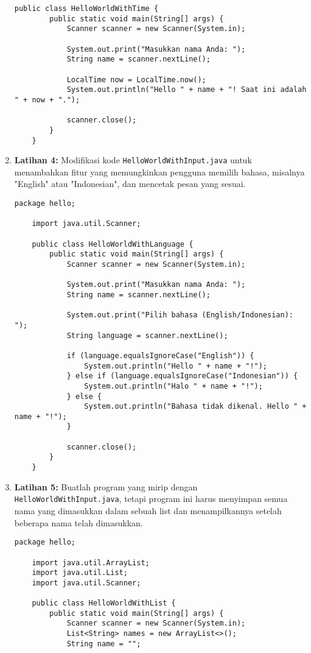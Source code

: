 \begin{enumerate}
\begin{lstlisting}[style=JavaStyle, caption={Latihan 3}]
	public class HelloWorldWithTime {
		public static void main(String[] args) {
			Scanner scanner = new Scanner(System.in);
			
			System.out.print("Masukkan nama Anda: ");
			String name = scanner.nextLine();
			
			LocalTime now = LocalTime.now();
			System.out.println("Hello " + name + "! Saat ini adalah " + now + ".");
			
			scanner.close();
		}
	}
\end{lstlisting}

\item \textbf{Latihan 4:} Modifikasi kode \texttt{HelloWorldWithInput.java} untuk menambahkan fitur yang memungkinkan pengguna memilih bahasa, misalnya "English" atau "Indonesian", dan mencetak pesan yang sesuai.

\begin{lstlisting}[style=JavaStyle, caption={Latihan 4}]
	package hello;
	
	import java.util.Scanner;
	
	public class HelloWorldWithLanguage {
		public static void main(String[] args) {
			Scanner scanner = new Scanner(System.in);
			
			System.out.print("Masukkan nama Anda: ");
			String name = scanner.nextLine();
			
			System.out.print("Pilih bahasa (English/Indonesian): ");
			String language = scanner.nextLine();
			
			if (language.equalsIgnoreCase("English")) {
				System.out.println("Hello " + name + "!");
			} else if (language.equalsIgnoreCase("Indonesian")) {
				System.out.println("Halo " + name + "!");
			} else {
				System.out.println("Bahasa tidak dikenal. Hello " + name + "!");
			}
			
			scanner.close();
		}
	}
\end{lstlisting}

\item \textbf{Latihan 5:} Buatlah program yang mirip dengan \texttt{HelloWorldWithInput.java}, tetapi program ini harus menyimpan semua nama yang dimasukkan dalam sebuah list dan menampilkannya setelah beberapa nama telah dimasukkan.

\begin{lstlisting}[style=JavaStyle, caption={Latihan 5}]
	package hello;
	
	import java.util.ArrayList;
	import java.util.List;
	import java.util.Scanner;
	
	public class HelloWorldWithList {
		public static void main(String[] args) {
			Scanner scanner = new Scanner(System.in);
			List<String> names = new ArrayList<>();
			String name = "";
			

\end{lstlisting}
\end{enumerate}
